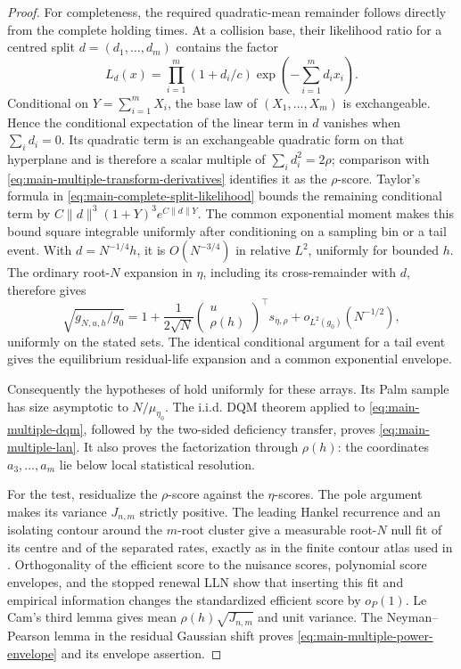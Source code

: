 \begin{proof}
For completeness, the required quadratic-mean remainder follows directly
from the complete holding times.  At a collision base, their likelihood
ratio for a centred split \(d=(d_1,\ldots,d_m)\) contains the factor
\begin{equation}
 L_d(x)=\prod_{i=1}^m(1+d_i/c)
 \exp\left(-\sum_{i=1}^m d_ix_i\right).
\label{eq:main-complete-split-likelihood}
\end{equation}
Conditional on \(Y=\sum_{i=1}^mX_i\), the base law of
\((X_1,\ldots,X_m)\) is exchangeable.  Hence the conditional expectation
of the linear term in \(d\) vanishes when \(\sum_i d_i=0\).  Its quadratic
term is an exchangeable quadratic form on that hyperplane and is therefore
a scalar multiple of \(\sum_i d_i^2=2\rho\); comparison with
\eqref{eq:main-multiple-transform-derivatives} identifies it as the
\(\rho\)-score.  Taylor's formula in
\eqref{eq:main-complete-split-likelihood} bounds the remaining conditional
term by
\(C\|d\|^3(1+Y)^3e^{C\|d\|Y}\).  The common exponential moment makes this
bound square integrable uniformly after conditioning on a sampling bin or a
tail event.  With \(d=N^{-1/4}h\), it is \(O(N^{-3/4})\) in relative
\(L^2\), uniformly for bounded \(h\).  The ordinary root-\(N\) expansion in
\(\eta\), including its cross-remainder with \(d\), therefore gives
\begin{equation}
 \sqrt{g_{N,u,h}/g_0}
 =1+\frac1{2\sqrt N}
 \begin{pmatrix}u\\\rho(h)\end{pmatrix}^{\!\top}
 s_{\eta,\rho}+o_{L^2(g_0)}(N^{-1/2}),
\label{eq:main-multiple-dqm}
\end{equation}
uniformly on the stated sets.  The identical conditional argument for a
tail event gives the equilibrium residual-life expansion and a common
exponential envelope.

Consequently the hypotheses of
 hold uniformly for these
arrays.  Its Palm sample has size asymptotic to \(N/\mu_{\eta_0}\).
The i.i.d. DQM theorem applied to
\eqref{eq:main-multiple-dqm}, followed by the two-sided deficiency transfer,
proves \eqref{eq:main-multiple-lan}.  It also proves the factorization through
\(\rho(h)\): the coordinates \(a_3,\ldots,a_m\) lie below local statistical
resolution.

For the test, residualize the \(\rho\)-score against the \(\eta\)-scores.
The pole argument makes its variance \(J_{n,m}\) strictly positive.  The
leading Hankel recurrence and an isolating contour around the \(m\)-root
cluster give a measurable root-\(N\) null fit of its centre and of the
separated rates, exactly as in the finite contour atlas used in
.  Orthogonality of the efficient
score to the nuisance scores, polynomial score envelopes, and the stopped
renewal LLN show that inserting this fit and empirical information changes
the standardized efficient score by \(o_P(1)\).  Le Cam's third lemma gives
mean \(\rho(h)\sqrt{J_{n,m}}\) and unit variance.  The
Neyman--Pearson lemma in the residual Gaussian shift proves
\eqref{eq:main-multiple-power-envelope} and its envelope assertion.


\end{proof}
